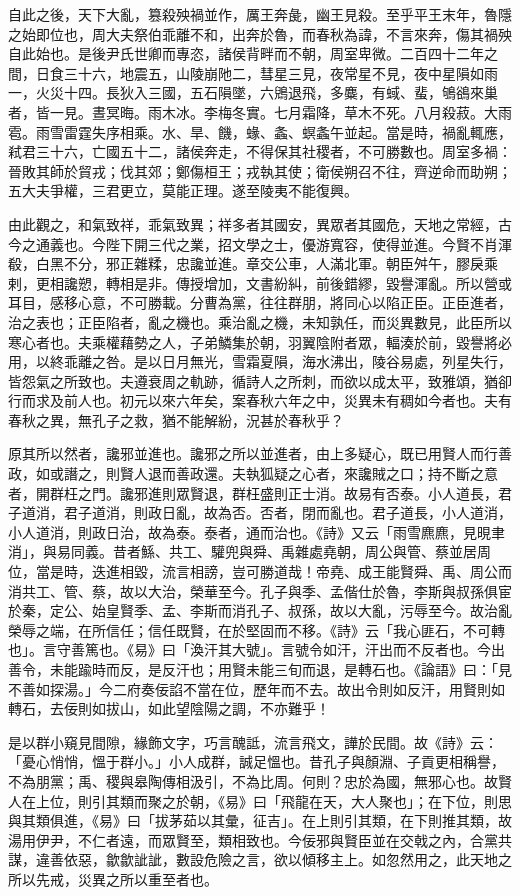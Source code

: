 \begin{pinyinscope}
自此之後，天下大亂，篡殺殃禍並作，厲王奔彘，幽王見殺。至乎平王末年，魯隱之始即位也，周大夫祭伯乖離不和，出奔於魯，而春秋為諱，不言來奔，傷其禍殃自此始也。是後尹氏世卿而專恣，諸侯背畔而不朝，周室卑微。二百四十二年之間，日食三十六，地震五，山陵崩阤二，彗星三見，夜常星不見，夜中星隕如雨一，火災十四。長狄入三國，五石隕墜，六鶂退飛，多麋，有蜮、蜚，鴝鵒來巢者，皆一見。晝冥晦。雨木冰。李梅冬實。七月霜降，草木不死。八月殺菽。大雨雹。雨雪雷霆失序相乘。水、旱、饑，蝝、螽、螟螽午並起。當是時，禍亂輒應，弒君三十六，亡國五十二，諸侯奔走，不得保其社稷者，不可勝數也。周室多禍：晉敗其師於貿戎；伐其郊；鄭傷桓王；戎執其使；衛侯朔召不往，齊逆命而助朔；五大夫爭權，三君更立，莫能正理。遂至陵夷不能復興。

由此觀之，和氣致祥，乖氣致異；祥多者其國安，異眾者其國危，天地之常經，古今之通義也。今陛下開三代之業，招文學之士，優游寬容，使得並進。今賢不肖渾殽，白黑不分，邪正雜糅，忠讒並進。章交公車，人滿北軍。朝臣舛午，膠戾乘剌，更相讒愬，轉相是非。傳授增加，文書紛糾，前後錯繆，毀譽渾亂。所以營或耳目，感移心意，不可勝載。分曹為黨，往往群朋，將同心以陷正臣。正臣進者，治之表也；正臣陷者，亂之機也。乘治亂之機，未知孰任，而災異數見，此臣所以寒心者也。夫乘權藉勢之人，子弟鱗集於朝，羽翼陰附者眾，輻湊於前，毀譽將必用，以終乖離之咎。是以日月無光，雪霜夏隕，海水沸出，陵谷易處，列星失行，皆怨氣之所致也。夫遵衰周之軌跡，循詩人之所刺，而欲以成太平，致雅頌，猶卻行而求及前人也。初元以來六年矣，案春秋六年之中，災異未有稠如今者也。夫有春秋之異，無孔子之救，猶不能解紛，況甚於春秋乎？

原其所以然者，讒邪並進也。讒邪之所以並進者，由上多疑心，既已用賢人而行善政，如或譖之，則賢人退而善政還。夫執狐疑之心者，來讒賊之口；持不斷之意者，開群枉之門。讒邪進則眾賢退，群枉盛則正士消。故易有否泰。小人道長，君子道消，君子道消，則政日亂，故為否。否者，閉而亂也。君子道長，小人道消，小人道消，則政日治，故為泰。泰者，通而治也。《詩》又云「雨雪麃麃，見晛聿消」，與易同義。昔者鯀、共工、驩兜與舜、禹雜處堯朝，周公與管、蔡並居周位，當是時，迭進相毀，流言相謗，豈可勝道哉！帝堯、成王能賢舜、禹、周公而消共工、管、蔡，故以大治，榮華至今。孔子與季、孟偕仕於魯，李斯與叔孫俱宦於秦，定公、始皇賢季、孟、李斯而消孔子、叔孫，故以大亂，污辱至今。故治亂榮辱之端，在所信任；信任既賢，在於堅固而不移。《詩》云「我心匪石，不可轉也」。言守善篤也。《易》曰「渙汗其大號」。言號令如汗，汗出而不反者也。今出善令，未能踰時而反，是反汗也；用賢未能三旬而退，是轉石也。《論語》曰：「見不善如探湯。」今二府奏佞諂不當在位，歷年而不去。故出令則如反汗，用賢則如轉石，去佞則如拔山，如此望陰陽之調，不亦難乎！

是以群小窺見間隙，緣飾文字，巧言醜詆，流言飛文，譁於民間。故《詩》云：「憂心悄悄，慍于群小。」小人成群，誠足慍也。昔孔子與顏淵、子貢更相稱譽，不為朋黨；禹、稷與皋陶傳相汲引，不為比周。何則？忠於為國，無邪心也。故賢人在上位，則引其類而聚之於朝，《易》曰「飛龍在天，大人聚也」；在下位，則思與其類俱進，《易》曰「拔茅茹以其彙，征吉」。在上則引其類，在下則推其類，故湯用伊尹，不仁者遠，而眾賢至，類相致也。今佞邪與賢臣並在交戟之內，合黨共謀，違善依惡，歙歙訿訿，數設危險之言，欲以傾移主上。如忽然用之，此天地之所以先戒，災異之所以重至者也。


\end{pinyinscope}
